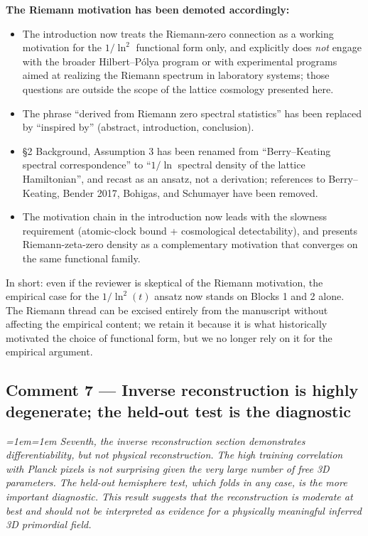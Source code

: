 \documentclass[12pt,a4paper]{article}
\newenvironment{review}{\par\color{revcolor}\itshape\leftskip=1em\rightskip=1em\noindent}{\par}
\begin{document}
\textbf{The Riemann motivation has been demoted accordingly:}
\begin{itemize}[leftmargin=2em]
  \item The introduction now treats the Riemann-zero connection as a working motivation for the $1/\ln^2$ functional form only, and explicitly does \emph{not} engage with the broader Hilbert--P\'olya program or with experimental programs aimed at realizing the Riemann spectrum in laboratory systems; those questions are outside the scope of the lattice cosmology presented here.
  \item The phrase ``derived from Riemann zero spectral statistics'' has been replaced by ``inspired by'' (abstract, introduction, conclusion).
  \item §2 Background, Assumption 3 has been renamed from ``Berry--Keating spectral correspondence'' to ``$1/\ln$ spectral density of the lattice Hamiltonian'', and recast as an ansatz, not a derivation; references to Berry--Keating, Bender 2017, Bohigas, and Schumayer have been removed.
  \item The motivation chain in the introduction now leads with the slowness requirement (atomic-clock bound + cosmological detectability), and presents Riemann-zeta-zero density as a complementary motivation that converges on the same functional family.
\end{itemize}

In short: even if the reviewer is skeptical of the Riemann motivation, the empirical case for the $1/\ln^2(t)$ ansatz now stands on Blocks 1 and 2 alone.
The Riemann thread can be excised entirely from the manuscript without affecting the empirical content; we retain it because it is what historically motivated the choice of functional form, but we no longer rely on it for the empirical argument.

\subsection*{Comment 7 --- Inverse reconstruction is highly degenerate; the held-out test is the diagnostic}

\begin{review}
\textit{Seventh, the inverse reconstruction section demonstrates differentiability, but not physical reconstruction. The high training correlation with Planck pixels is not surprising given the very large number of free 3D parameters. The held-out hemisphere test, which folds in any case, is the more important diagnostic. This result suggests that the reconstruction is moderate at best and should not be interpreted as evidence for a physically meaningful inferred 3D primordial field.}
\end{review}
\end{document}

